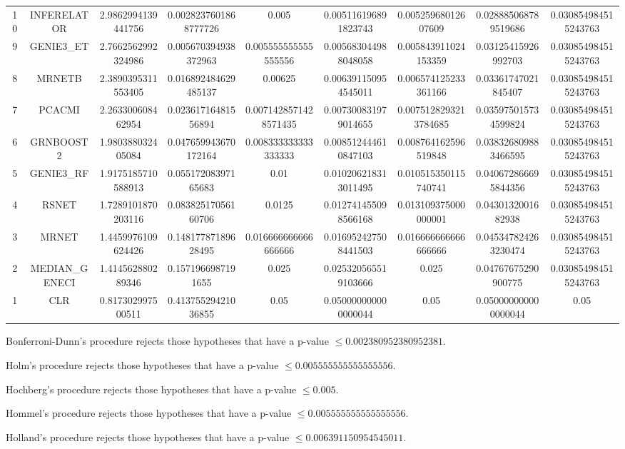 \documentclass[a4paper,10pt]{article}
\begin{document}
\begin{landscape}
\begin{table}[!htp]
\begin{tabular}{ccccccccc}
10&INFERELATOR&2.9862994139441756&0.0028237601868777726&0.005&0.005116196891823743&0.00525968012607609&0.028885068789519686&0.030854984515243763\\
9&GENIE3_ET&2.7662562992324986&0.005670394938372963&0.005555555555555556&0.005683044988048058&0.005843911024153359&0.03125415926992703&0.030854984515243763\\
8&MRNETB&2.3890395311553405&0.016892484629485137&0.00625&0.006391150954545011&0.006574125233361166&0.03361747021845407&0.030854984515243763\\
7&PCACMI&2.263300608462954&0.02361716481556894&0.0071428571428571435&0.007300831979014655&0.0075128293213784685&0.035975015734599824&0.030854984515243763\\
6&GRNBOOST2&1.980388032405084&0.047659943670172164&0.008333333333333333&0.008512444610847103&0.008764162596519848&0.038326809883466595&0.030854984515243763\\
5&GENIE3_RF&1.9175185710588913&0.05517208397165683&0.01&0.010206218313011495&0.010515350115740741&0.040672866695844356&0.030854984515243763\\
4&RSNET&1.7289101870203116&0.08382517056160706&0.0125&0.012741455098566168&0.013109375000000001&0.0430132001682938&0.030854984515243763\\
3&MRNET&1.4459976109624426&0.14817787189628495&0.016666666666666666&0.016952427508441503&0.016666666666666666&0.045347824263230474&0.030854984515243763\\
2&MEDIAN_GENECI&1.414562880289346&0.1571966987191655&0.025&0.025320565519103666&0.025&0.04767675290900775&0.030854984515243763\\
1&CLR&0.817302997500511&0.41375529421036855&0.05&0.050000000000000044&0.05&0.050000000000000044&0.05\\
\hline
\end{tabular}
\end{table}
Bonferroni-Dunn's procedure rejects those hypotheses that have a p-value $\le0.002380952380952381$.


Holm's procedure rejects those hypotheses that have a p-value $\le0.005555555555555556$.


Hochberg's procedure rejects those hypotheses that have a p-value $\le0.005$.


Hommel's procedure rejects those hypotheses that have a p-value $\le0.005555555555555556$.


Holland's procedure rejects those hypotheses that have a p-value $\le0.006391150954545011$.



\end{landscape}
\end{document}
